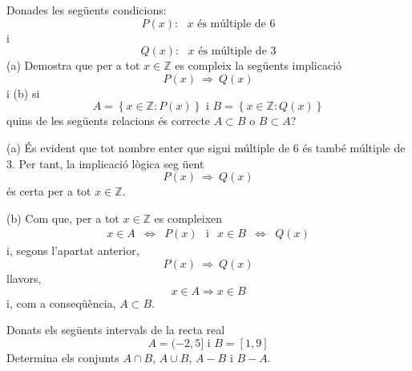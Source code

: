 \begin{exercici}
Donades les seg\"{u}ents condicions:%
\begin{equation*}
P(x):\text{ }x\text{ \'{e}s m\'{u}ltiple de }6
\end{equation*}%
i%
\begin{equation*}
Q(x):\text{ }x\text{ \'{e}s m\'{u}ltiple de }3
\end{equation*}%
(a) Demostra que per a tot $x\in \mathbb{Z}$ es compleix la seg\"{u}ents
implicaci\'{o}
\begin{equation*}
P(x)~\Longrightarrow ~Q(x)
\end{equation*}%
i (b) si%
\begin{equation*}
A=\left\{ x\in \mathbb{Z}:P(x)\right\} \text{ \ \ i \ \ }B=\left\{ x\in
\mathbb{Z}:Q(x)\right\}
\end{equation*}%
quins de les seg\"{u}ents relacions \'{e}s correcte $A\subset B$ o $B\subset
A$?
\end{exercici}

\begin{solucio}
(a) \'{E}s evident que tot nombre enter que sigui m\'{u}ltiple de $6$ \'{e}s
tamb\'{e} m\'{u}ltiple de $3$. Per tant, la implicaci\'{o} l\`{o}gica seg%
\"{u}ent%
\begin{equation*}
P(x)~\Longrightarrow ~Q(x)
\end{equation*}%
\'{e}s certa per a tot $x\in \mathbb{Z}$.

(b) Com que, per a tot $x\in \mathbb{Z}$ es compleixen%
\begin{equation*}
\begin{array}{ccc}
x\in A & \Longleftrightarrow & P(x)%
\end{array}%
\text{ \ \ i \ \ }%
\begin{array}{ccc}
x\in B & \Longleftrightarrow & Q(x)%
\end{array}%
\end{equation*}%
i, segons l'apartat anterior,%
\begin{equation*}
P(x)~\Longrightarrow ~Q(x)
\end{equation*}%
llavors,%
\begin{equation*}
x\in A\Longrightarrow x\in B
\end{equation*}%
i, com a conseq\"{u}\`{e}ncia, $A\subset B$.
\end{solucio}

\begin{exercici}
Donats els seg\"{u}ents intervals de la recta real%
\begin{equation*}
A=(-2,5]\text{ \ \ \ i \ \ \ }B=[1,9]
\end{equation*}%
Determina els conjunts $A\cap B$, $A\cup B$, $A-B$ i $B-A$.
\end{exercici}


